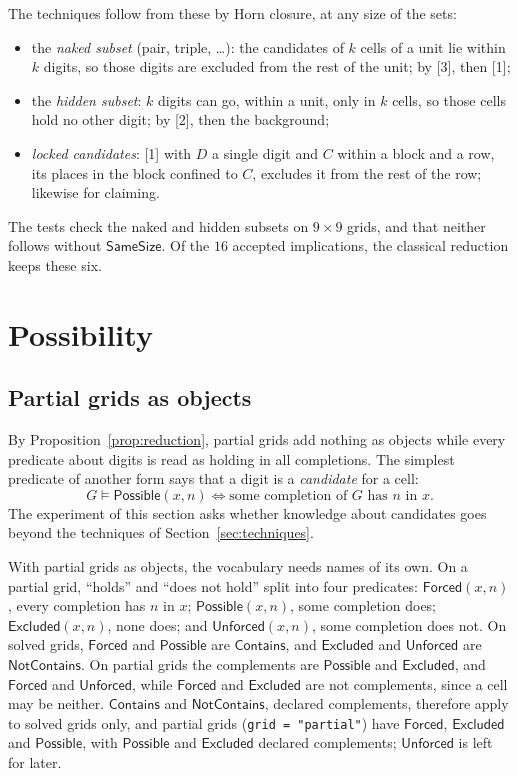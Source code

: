 \documentclass[11pt,a4paper]{article}
\theoremstyle{definition}
\theoremstyle{remark}
\newcommand{\code}[1]{\texttt{#1}}
\newcommand{\pred}[1]{\mathsf{#1}}
\newcommand{\Contains}{\pred{Contains}}
\newcommand{\NotContains}{\pred{NotContains}}
\newcommand{\Forced}{\pred{Forced}}
\newcommand{\Excluded}{\pred{Excluded}}
\newcommand{\sat}{\models}
\begin{document}
The techniques follow from these by Horn closure, at any size of the sets:
\begin{itemize}
  \item the \emph{naked subset} (pair, triple, \dots): the candidates of $k$ cells of a unit lie within $k$ digits, so those digits are excluded from the rest of the unit; by [3], then [1];
  \item the \emph{hidden subset}: $k$ digits can go, within a unit, only in $k$ cells, so those cells hold no other digit; by [2], then the background;
  \item \emph{locked candidates}: [1] with $D$ a single digit and $C$ within a block and a row, its places in the block confined to $C$, excludes it from the rest of the row; likewise for claiming.
\end{itemize}
The tests check the naked and hidden subsets on $9 \times 9$ grids, and that neither follows without $\pred{SameSize}$. Of the $16$ accepted implications, the classical reduction keeps these six.

\section{Possibility}\label{sec:possible}

\subsection{Partial grids as objects}

By Proposition~\ref{prop:reduction}, partial grids add nothing as objects while every predicate about digits is read as holding in all completions. The simplest predicate of another form says that a digit is a \emph{candidate} for a cell:
\[
  G \sat \pred{Possible}(x, n) \iff \text{some completion of $G$ has $n$ in $x$.}
\]
The experiment of this section asks whether knowledge about candidates goes beyond the techniques of Section~\ref{sec:techniques}.

With partial grids as objects, the vocabulary needs names of its own. On a partial grid, ``holds'' and ``does not hold'' split into four predicates: $\Forced(x, n)$, every completion has $n$ in $x$; $\pred{Possible}(x, n)$, some completion does; $\Excluded(x, n)$, none does; and $\pred{Unforced}(x, n)$, some completion does not. On solved grids, $\Forced$ and $\pred{Possible}$ are $\Contains$, and $\Excluded$ and $\pred{Unforced}$ are $\NotContains$. On partial grids the complements are $\pred{Possible}$ and $\Excluded$, and $\Forced$ and $\pred{Unforced}$, while $\Forced$ and $\Excluded$ are not complements, since a cell may be neither. $\Contains$ and $\NotContains$, declared complements, therefore apply to solved grids only, and partial grids (\code{grid = "partial"}) have $\Forced$, $\Excluded$ and $\pred{Possible}$, with $\pred{Possible}$ and $\Excluded$ declared complements; $\pred{Unforced}$ is left for later.
\end{document}
